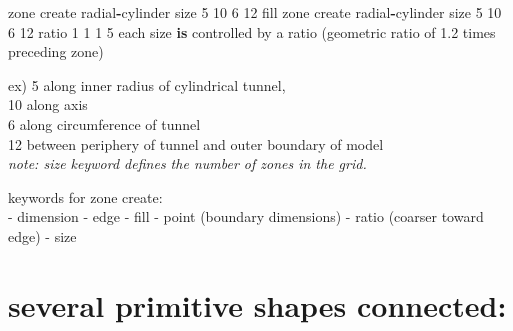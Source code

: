 \documentclass[a4paper, nobind]{templates/ociamthesis}
\newenvironment{Shaded}{\begin{snugshade}}{\end{snugshade}}
\newcommand{\DecValTok}[1]{\textcolor[rgb]{0.00,0.00,0.81}{#1}}
\newcommand{\FloatTok}[1]{\textcolor[rgb]{0.00,0.00,0.81}{#1}}
\newcommand{\KeywordTok}[1]{\textcolor[rgb]{0.13,0.29,0.53}{\textbf{#1}}}
\newcommand{\NormalTok}[1]{#1}
\newcommand{\OperatorTok}[1]{\textcolor[rgb]{0.81,0.36,0.00}{\textbf{#1}}}
\renewenvironment{Shaded}
{
  \vspace{10pt}%
  \begin{snugshade}%
}{%
  \end{snugshade}%
  \vspace{8pt}%
}
\begin{document}
\begin{Shaded}
\begin{Highlighting}[]
\NormalTok{zone create radial}\OperatorTok{{-}}\NormalTok{cylinder size }\DecValTok{5} \DecValTok{10} \DecValTok{6} \DecValTok{12}\NormalTok{ fill}
\NormalTok{zone create radial}\OperatorTok{{-}}\NormalTok{cylinder size }\DecValTok{5} \DecValTok{10} \DecValTok{6} \DecValTok{12}\NormalTok{ ratio }\DecValTok{1} \DecValTok{1} \DecValTok{1} \DecValTok{5}
\NormalTok{each size }\KeywordTok{is}\NormalTok{ controlled by a ratio (geometric ratio of }\FloatTok{1.2}\NormalTok{ times preceding zone)}
\end{Highlighting}
\end{Shaded}

ex) 5 along inner radius of cylindrical tunnel,\\
10 along axis\\
6 along circumference of tunnel\\
12 between periphery of tunnel and outer boundary of model\\
\emph{note: size keyword defines the number of zones in the grid.}

keywords for zone create:\\
- dimension - edge - fill - point (boundary dimensions) - ratio (coarser
toward edge) - size

\hypertarget{several-primitive-shapes-connected}{%
\section{several primitive shapes connected:}\label{several-primitive-shapes-connected}}
\end{document}
